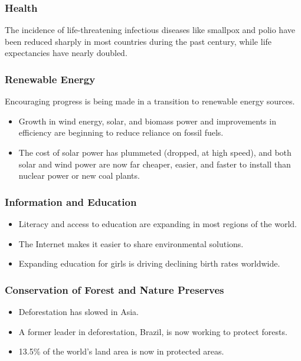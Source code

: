 \documentclass[10pt]{article}
\begin{document}
\subsubsection{Health}
The incidence of life-threatening infectious diseases like smallpox and polio have been reduced sharply in most countries during the past century, while life expectancies have nearly doubled. 

\subsubsection{Renewable Energy}
Encouraging progress is being made in a transition to renewable energy sources.
\begin{itemize}
    \item Growth in wind energy, solar, and biomass power and improvements in efficiency are beginning to reduce reliance on fossil fuels.
    \item The cost of solar power has plummeted (dropped, at high speed), and both solar and wind power are now far cheaper, easier, and faster to install than nuclear power or new coal plants. 
\end{itemize}

\subsubsection{Information and Education}
\begin{itemize}
    \item Literacy and access to education are expanding in most regions of the world.
    \item The Internet makes it easier to share environmental solutions.
    \item Expanding education for girls is driving declining birth rates worldwide.
\end{itemize}

\subsubsection{Conservation of Forest and Nature Preserves}
\begin{itemize}
    \item Deforestation has slowed in Asia.
    \item A former leader in deforestation, Brazil, is now working to protect forests.
    \item 13.5\% of the world's land area is now in protected areas.
\end{itemize}
\end{document}
